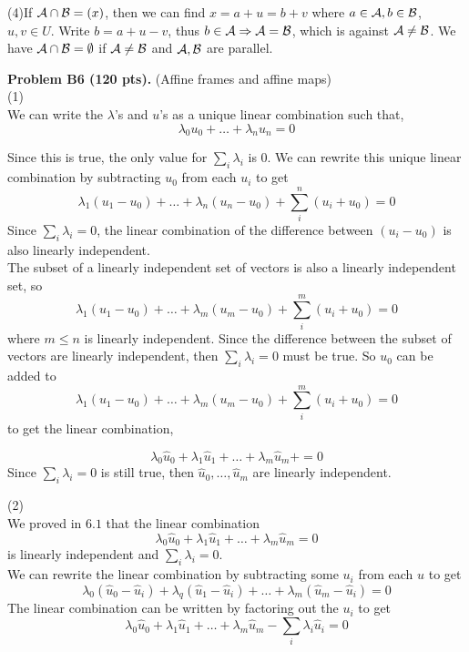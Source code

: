 \documentclass[12pt]{article}
\begin{document}
\medskip
(4)If ${\cal A}\cap {\cal B} = (x)$, then we can find $x = a + u = b + v$ where $a \in {\cal A}, b \in {\cal B}$, $u, v \in U$. Write $b = a + u - v$, thus $b \in {\cal A} \Rightarrow {\cal A} = {\cal B}$, which is against ${\cal A} \neq {\cal B}$. We have ${\cal A} \cap {\cal B} = \emptyset$ if ${\cal A} \neq {\cal B}$ and ${\cal A}, {\cal B}$ are parallel. 

\vspace {0.25cm}\noindent
{\bf Problem B6 (120 pts).} (Affine frames and affine maps) \\
(1) \\

We can write the $\lambda$'s and $u$'s as a unique linear combination such that, 
$$ \lambda_0 u_0 + \ldots + \lambda_n u_n = 0 $$

Since this is true, the only value for $\sum_{i} \lambda_i$ is 0. We can rewrite this unique linear combination by subtracting $u_0$ from each $u_i$ to get $$\lambda_1 (u_1 - u_0) + \ldots + \lambda_n (u_n - u_0) + \sum_{i}^{n} (u_i + u_0) = 0$$ Since $\sum_{i} \lambda_i = 0$, the linear combination of the difference between $(u_i - u_0)$ is also linearly independent. \\

The subset of a linearly independent set of vectors is also a linearly independent set, so $$\lambda_1 (u_1 - u_0) + \ldots + \lambda_m (u_m - u_0) + \sum_{i}^{m} (u_i + u_0) = 0$$ where $m \leq n$ is linearly independent. Since the difference between the subset of vectors are linearly independent, then $\sum_{i} \lambda_i = 0$ must be true. So $u_0$ can be added to $$\lambda_1 (u_1 - u_0) + \ldots + \lambda_m (u_m - u_0) + \sum_{i}^{m} (u_i + u_0) = 0$$ to get the linear combination, 

$$\lambda_0 \hat{u}_0  + \lambda_1 \hat{u}_1  + \ldots + \lambda_m \hat{u}_m  + = 0$$ Since $\sum_{i} \lambda_i = 0$ is still true, then $\hat{u}_0, \ldots, \hat{u}_m$ are linearly independent.   


\medskip
(2) \\
We proved in $6.1$ that the linear combination $$\lambda_0 \hat{u}_0  + \lambda_1 \hat{u}_1  + \ldots + \lambda_m \hat{u}_m  = 0$$ is linearly independent and $\sum_{i} \lambda_i = 0$. \\

We can rewrite the linear combination by subtracting some $u_i$ from each $u$ to get $$\lambda_0 (\hat{u}_0 - \hat{u}_i)  + \lambda_q (\hat{u}_1 - \hat{u}_i)+ \ldots + \lambda_m (\hat{u}_m - \hat{u}_i) = 0$$ The linear combination can be written by factoring out the $u_i$ to get  $$\lambda_0 \hat{u}_0  + \lambda_1 \hat{u}_1 + \ldots + \lambda_m \hat{u}_m  -  \sum_{i} \lambda_i \hat{u}_i= 0$$
\end{document}
